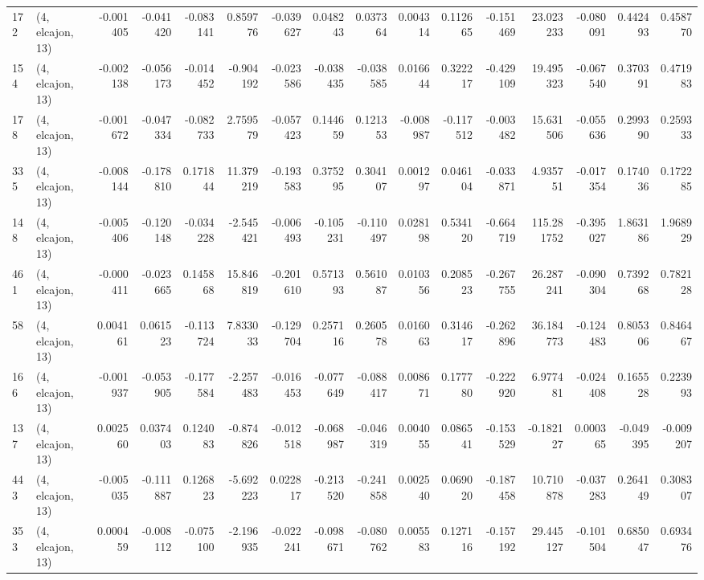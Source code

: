 \begin{tabular}{llrrrrrrrrrrrrrr}
172 &  (4, elcajon, 13) &  -0.001405 & -0.041420 & -0.083141 &    0.859776 & -0.039627 &   0.048243 &  0.037364 &  0.004314 &  0.112665 & -0.151469 &   23.023233 & -0.080091 &  0.442493 &  0.458770 \\
154 &  (4, elcajon, 13) &  -0.002138 & -0.056173 & -0.014452 &   -0.904192 & -0.023586 &  -0.038435 & -0.038585 &  0.016644 &  0.322217 & -0.429109 &   19.495323 & -0.067540 &  0.370391 &  0.471983 \\
178 &  (4, elcajon, 13) &  -0.001672 & -0.047334 & -0.082733 &    2.759579 & -0.057423 &   0.144659 &  0.121353 & -0.008987 & -0.117512 & -0.003482 &   15.631506 & -0.055636 &  0.299390 &  0.259333 \\
335 &  (4, elcajon, 13) &  -0.008144 & -0.178810 &  0.171844 &   11.379219 & -0.193583 &   0.375295 &  0.304107 &  0.001297 &  0.046104 & -0.033871 &    4.935751 & -0.017354 &  0.174036 &  0.172285 \\
148 &  (4, elcajon, 13) &  -0.005406 & -0.120148 & -0.034228 &   -2.545421 & -0.006493 &  -0.105231 & -0.110497 &  0.028198 &  0.534120 & -0.664719 &  115.281752 & -0.395027 &  1.863186 &  1.968929 \\
461 &  (4, elcajon, 13) &  -0.000411 & -0.023665 &  0.145868 &   15.846819 & -0.201610 &   0.571393 &  0.561087 &  0.010356 &  0.208523 & -0.267755 &   26.287241 & -0.090304 &  0.739268 &  0.782128 \\
58  &  (4, elcajon, 13) &   0.004161 &  0.061523 & -0.113724 &    7.833033 & -0.129704 &   0.257116 &  0.260578 &  0.016063 &  0.314617 & -0.262896 &   36.184773 & -0.124483 &  0.805306 &  0.846467 \\
166 &  (4, elcajon, 13) &  -0.001937 & -0.053905 & -0.177584 &   -2.257483 & -0.016453 &  -0.077649 & -0.088417 &  0.008671 &  0.177780 & -0.222920 &    6.977481 & -0.024408 &  0.165528 &  0.223993 \\
137 &  (4, elcajon, 13) &   0.002560 &  0.037403 &  0.124083 &   -0.874826 & -0.012518 &  -0.068987 & -0.046319 &  0.004055 &  0.086541 & -0.153529 &   -0.182127 &  0.000365 & -0.049395 & -0.009207 \\
443 &  (4, elcajon, 13) &  -0.005035 & -0.111887 &  0.126823 &   -5.692223 &  0.022817 &  -0.213520 & -0.241858 &  0.002540 &  0.069020 & -0.187458 &   10.710878 & -0.037283 &  0.264149 &  0.308307 \\
353 &  (4, elcajon, 13) &   0.000459 & -0.008112 & -0.075100 &   -2.196935 & -0.022241 &  -0.098671 & -0.080762 &  0.005583 &  0.127116 & -0.157192 &   29.445127 & -0.101504 &  0.685047 &  0.693476 \\

\end{tabular}
